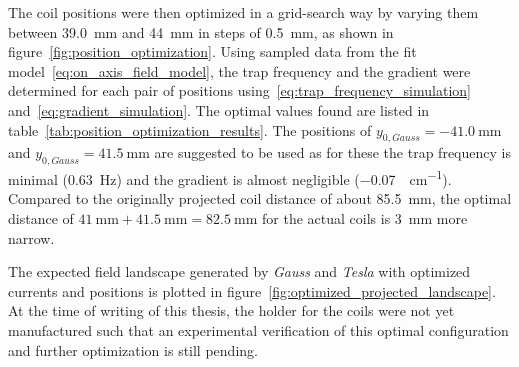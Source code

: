 The coil positions were then optimized in a grid-search way by varying them between \SI{39.0}{\milli\meter} and \SI{44}{\milli\meter} in steps of \SI{0.5}{\milli\meter}, as shown in figure~\ref{fig:position_optimization}. Using sampled data from the fit model~\eqref{eq:on_axis_field_model}, the trap frequency and the gradient were determined for each pair of positions using~\eqref{eq:trap_frequency_simulation} and~\eqref{eq:gradient_simulation}.
The optimal values found are listed in table~\ref{tab:position_optimization_results}. The positions of $y_{0, \textit{Gauss}} = \SI{-41.0}{\milli\meter}$ and $y_{0, \textit{Gauss}} = \SI{41.5}{\milli\meter}$ are suggested to be used as for these the trap frequency is minimal (\SI{0.63}{\hertz}) and the gradient is almost negligible (\SI{-0.07}{\gauss\per\centi\meter}). Compared to the originally projected coil distance of about \SI{85.5}{\milli\meter}, the optimal distance of $\SI{41}{\milli\meter} + \SI{41.5}{\milli\meter} = \SI{82.5}{\milli\meter}$ for the actual coils is \SI{3}{\milli\meter} more narrow.

The expected field landscape generated by \textit{Gauss} and \textit{Tesla} with optimized currents and positions is plotted in figure~\ref{fig:optimized_projected_landscape}. At the time of writing of this thesis, the holder for the coils were not yet manufactured such that an experimental verification of this optimal configuration and further optimization is still pending.

